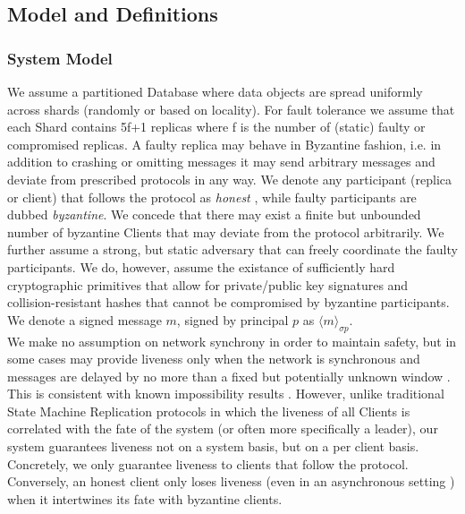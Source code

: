 \subsection{Model and Definitions}

\subsubsection{System Model}
We assume a partitioned Database where data objects are spread uniformly across shards (randomly or based on locality). For fault tolerance we assume that each Shard contains 5f+1  replicas where f is the number of (static) faulty or compromised replicas. A faulty replica may behave in Byzantine fashion, i.e. in addition to crashing or omitting messages it may send arbitrary messages and deviate from prescribed protocols in any way.
We denote any participant (replica or client) that follows the protocol as \textit{honest} , while faulty participants are dubbed \textit{byzantine}. We concede that there may exist a finite but unbounded number of byzantine Clients that may deviate from the protocol arbitrarily. 
 We further assume a strong, but static adversary that can freely coordinate the faulty participants.
 We do, however, assume the existance of sufficiently hard cryptographic primitives that allow for private/public key signatures and collision-resistant hashes that cannot be compromised by byzantine participants. We denote a signed message $m$, signed by principal $p$ as $\langle m \rangle_{\sigma p}$. \\
 
We make no assumption on network synchrony in order to maintain safety, but in some cases may provide liveness  only when the network is synchronous and messages are delayed by no more than a fixed but potentially unknown window . This is consistent with known impossibility results \cite{fischer1985impossibility}.
However, unlike traditional State Machine Replication protocols in which the liveness of all Clients is correlated with the fate of the system (or often more specifically a leader), our system guarantees liveness not on a system basis, but on a per client basis. Concretely, we only guarantee liveness to clients that follow the protocol. Conversely, an honest client only loses liveness (even in an asynchronous setting ) when it intertwines its fate with byzantine clients.\\

